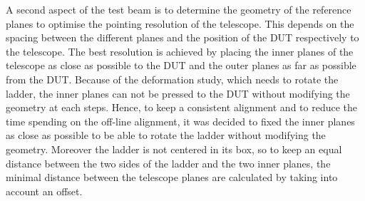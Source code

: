     A second aspect of the test beam is to determine the geometry of the reference planes to optimise the pointing resolution of the telescope.
    This depends on the spacing between the different planes and the position of the \gls{DUT} respectively to the telescope.
    The best resolution is achieved by placing the inner planes of the telescope as close as possible to the \gls{DUT} and the outer planes as far as possible from the \gls{DUT}.
    Because of the deformation study, which needs to rotate the ladder, the inner planes can not be pressed to the \gls{DUT} without modifying the geometry at each steps.
    Hence, to keep a consistent alignment and to reduce the time spending on the off-line alignment, it was decided to fixed the inner planes as close as possible to be able to rotate the ladder without modifying the geometry.
    Moreover the ladder is not centered in its box, so to keep an equal distance between the two sides of the ladder and the two inner planes, the minimal distance between the telescope planes are calculated by taking into account an offset.


